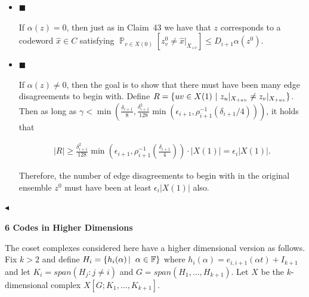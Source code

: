 \documentclass[10pt,a4paper]{article}
\begin{document}
\begin{itemize}


\item[] 
$\blacksquare$ 


If $\alpha(z)=0$, then just as in Claim 43 we have that $z$ corresponds to a codeword $\hat{x}\in C$ satisfying $\operatorname*{\mathbb{P}}_{v\in X(0)}[z^{0}_{v}\not=\hat{x}|_{X_{+v}}]\leq D_{i+1}\alpha(z^{0})$.\par





\item[] 
$\blacksquare$ 


If $\alpha(z)\not=0$, then the goal is to show that there must have been many edge disagreements to begin with. Define $R=\{uv\in X(1)\nobreak\ |\nobreak\ z_{u}|_{X_{+uv}}\not=z_{v}|_{X_{+uv}}\}$. Then as long as $\gamma<\min\left(\frac{\delta_{i+1}}{8},\frac{\delta_{i+1}^{2}}{128}\min\left(\epsilon_{i+1},\rho_{i+1}^{-1}(\delta_{i+1}/4)\right)\right)$, it holds that\par


\[\begin{gathered}
|R|\geq\frac{\delta_{i+1}^{2}}{128}\min\left(\epsilon_{i+1},\rho_{i+1}^{-1}\left(\frac{\delta_{i+1}}{4}\right)\right)\cdot|X(1)|=\epsilon_{i}|X(1)|.
\end{gathered}\]


Therefore, the number of edge disagreements to begin with in the original ensemble $z^{0}$ must have been at least $\epsilon_{i}|X(1)|$ also.\par





\end{itemize}


$\blacktriangleleft$\par







\par\medskip\noindent\textbf{
6 Codes in Higher Dimensions}\par




The coset complexes considered here have a higher dimensional version as follows. Fix $k>2$ and define $H_{i}=\left\{h_{i}(\alpha)\left|\;\vphantom{h_{i}(\alpha)\alpha\in\mathbb{F}}\right.\alpha\in\mathbb{F}\right\}$ where $h_{i}(\alpha)=e_{i,i+1}(\alpha t)+I_{k+1}$
and let $K_{i}=span(H_{j}:j\neq i)$ and $G=span(H_{1},\ldots,H_{k+1})$.
Let $X$ be the $k$-dimensional complex $X[G;K_{1},\ldots,K_{k+1}]$.\par
\end{document}
